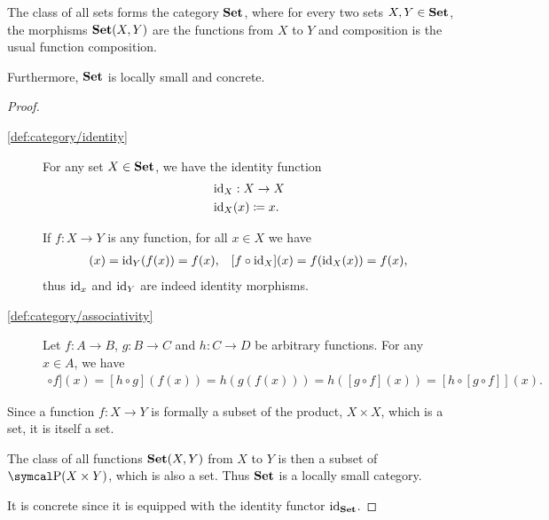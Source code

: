 \begin{definition}\label{def:category_of_sets}
  The class of all sets forms the category \( \operatorname{\mathbf{Set}} \), where for every two sets \( X, Y \in \operatorname{\mathbf{Set}} \), the morphisms \( \operatorname{\mathbf{Set}}(X, Y) \) are the functions from \( X \) to \( Y \) and composition is the usual function composition.

  Furthermore, \( \operatorname{\mathbf{Set}} \) is locally small and concrete.
\end{definition}
\begin{proof}
  \begin{description}
    \item [\ref{def:category/identity}] For any set \( X \in \operatorname{\mathbf{Set}} \), we have the identity function
    \begin{align*}
      &\operatorname{id}_X: X \to X \\
      &\operatorname{id}_X(x) \coloneqq x.
    \end{align*}

    If \( f: X \to Y \) is any function, for all \( x \in X \) we have
    \begin{align*}
      [\Id_Y \circ f](x) = \Id_Y(f(x)) = f(x),
      &&
      [f \circ \Id_X](x) = f(\Id_X(x)) = f(x),
    \end{align*}
    thus \( \operatorname{id}_x \) and \( \operatorname{id}_Y \) are indeed identity morphisms.

    \item [\ref{def:category/associativity}] Let \( f: A \to B \), \( g: B \to C \) and \( h: C \to D \) be arbitrary functions. For any \( x \in A \), we have
    \begin{align*}
      [[h \circ g] \circ f](x)
      =
      [h \circ g](f(x))
      =
      h(g(f(x)))
      =
      h([g \circ f](x))
      =
      [h \circ [g \circ f]](x).
    \end{align*}
  \end{description}

  Since a function \( f: X \to Y \) is formally a subset of the product, \( X \times X \), which is a set, it is itself a set.

  The class of all functions \( \operatorname{\mathbf{Set}}(X, Y) \) from \( X \) to \( Y \) is then a subset of \( \Power(X \times Y) \), which is also a set. Thus \( \operatorname{\mathbf{Set}} \) is a locally small category.

  It is concrete since it is equipped with the identity functor \( \operatorname{id}_{\operatorname{\mathbf{Set}}} \).
\end{proof}

